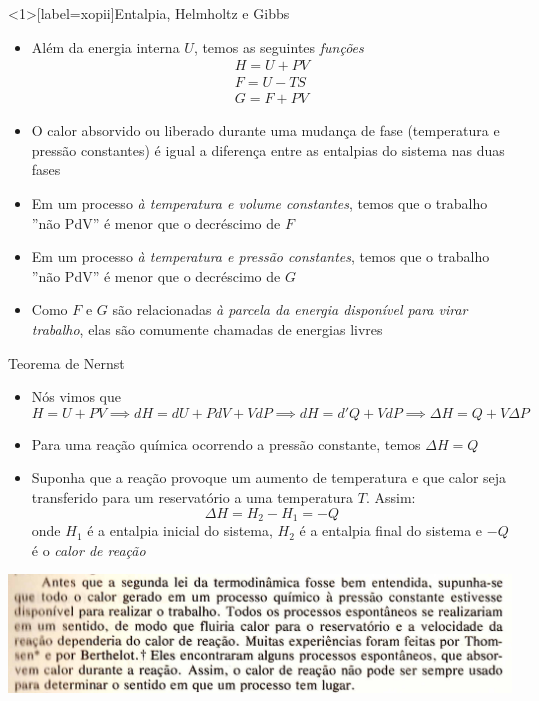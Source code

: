 \documentclass[t,%
brazilian,%
11pt,%
aspectratio=169,%
table%
]{beamer}
\begin{document}
    \begin{frame}<1>[label=xopii]{Entalpia, Helmholtz e Gibbs}
    \begin{itemize}
        \item Além da energia interna \(U\), temos as seguintes \textit{funções}
            \begin{gather*}
                H=U+PV \\
                F=U-TS \\
                G=F+PV
            \end{gather*}
        \item O calor absorvido ou liberado durante uma mudança de fase (temperatura 
            e pressão constantes) é igual a diferença entre as entalpias do sistema
            nas duas fases
            \pause
        \item Em um processo \textit{à temperatura e volume constantes}, temos que o 
            trabalho ''não PdV'' é menor que o decréscimo de \(F\)
        \item Em um processo \textit{à temperatura e pressão constantes}, temos que o 
            trabalho ''não PdV'' é menor que o decréscimo de \(G\)
        \item Como \(F\) e \(G\) são relacionadas \textit{à parcela da energia disponível para virar trabalho},
            elas são comumente chamadas de energias livres
    \end{itemize}
\end{frame}

\begin{frame}{Teorema de Nernst }
    \begin{itemize}
        \item Nós vimos que
            \[
                H=U+PV \implies dH = dU + PdV + VdP \implies dH = d'Q+VdP \implies \Delta H = Q + V\Delta P
            \]
        \item Para uma reação química ocorrendo a pressão constante, temos \(\Delta H=Q\)
        \item Suponha que a reação provoque um aumento de temperatura e que calor seja transferido para um reservatório
            a uma temperatura \(T\). Assim:
            \[
                \Delta H = H_2 - H_1 = -Q
            \]
            onde \(H_1\) é a entalpia inicial do sistema, \(H_2\) é a entalpia final do sistema e \(-Q\) é o 
            \textit{calor de reação}
    \end{itemize}
    \centering
    \includegraphics[width=\textwidth-75pt]{images/Captura de tela de 2023-05-24 12-05-18.png}
\end{frame}
\end{document}
